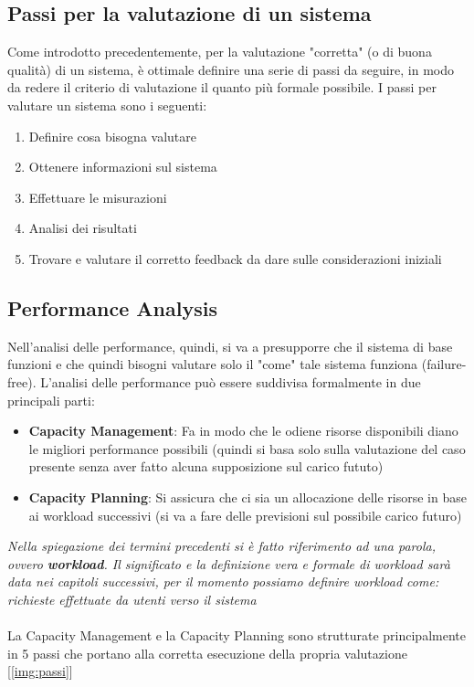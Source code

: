 \subsection{Passi per la valutazione di un sistema}
Come introdotto precedentemente, per la valutazione "corretta" (o di buona qualità) di un sistema, è ottimale definire una serie di passi da seguire, in modo da redere il criterio di valutazione il quanto più formale possibile. I passi per valutare un sistema sono i seguenti:
\begin{enumerate}
    \item Definire cosa bisogna valutare
    \item Ottenere informazioni sul sistema
    \item Effettuare le misurazioni
    \item Analisi dei risultati
    \item Trovare e valutare il corretto feedback da dare sulle considerazioni iniziali
\end{enumerate}

\subsection{Performance Analysis}
Nell'analisi delle performance, quindi, si va a presupporre che il sistema di base funzioni e che quindi bisogni valutare solo il "come" tale sistema funziona (failure-free).
L'analisi delle performance può essere suddivisa formalmente in due principali parti:
\begin{itemize}
    \item \textbf{Capacity Management}: Fa in modo che le odiene risorse disponibili diano le migliori performance possibili (quindi si basa solo sulla valutazione del caso presente senza aver fatto alcuna supposizione sul carico fututo)
    \item \textbf{Capacity Planning}: Si assicura che ci sia un allocazione delle risorse in base ai workload successivi (si va a fare delle previsioni sul possibile carico futuro)
\end{itemize}

\textit{Nella spiegazione dei termini precedenti si è fatto riferimento ad una parola, ovvero \textbf{workload}. Il significato e la definizione vera e formale di workload sarà data nei capitoli successivi, per il momento possiamo definire workload come: richieste effettuate da utenti verso il sistema
}
\\\\
La Capacity Management e la Capacity Planning sono strutturate principalmente in 5 passi che portano alla corretta esecuzione della propria valutazione [\ref{img:passi}]

